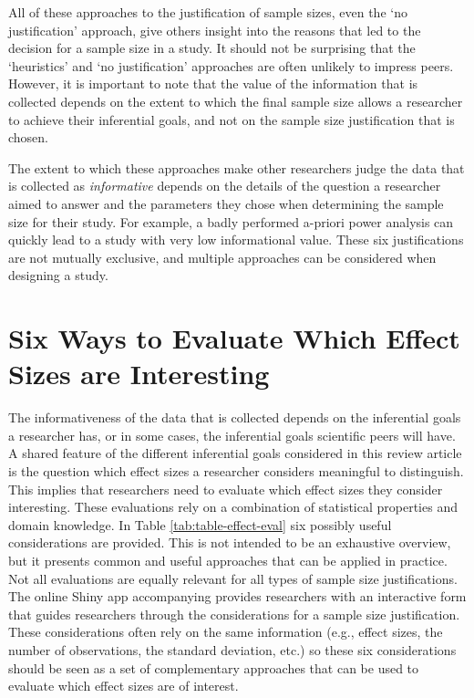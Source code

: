 \documentclass[
  oneside]{krantz}
\begin{document}
All of these approaches to the justification of sample sizes, even the `no justification' approach, give others insight into the reasons that led to the decision for a sample size in a study. It should not be surprising that the `heuristics' and `no justification' approaches are often unlikely to impress peers. However, it is important to note that the value of the information that is collected depends on the extent to which the final sample size allows a researcher to achieve their inferential goals, and not on the sample size justification that is chosen.

The extent to which these approaches make other researchers judge the data that is collected as \emph{informative} depends on the details of the question a researcher aimed to answer and the parameters they chose when determining the sample size for their study. For example, a badly performed a-priori power analysis can quickly lead to a study with very low informational value. These six justifications are not mutually exclusive, and multiple approaches can be considered when designing a study.

\hypertarget{six-ways-to-evaluate-which-effect-sizes-are-interesting}{%
\section{Six Ways to Evaluate Which Effect Sizes are Interesting}\label{six-ways-to-evaluate-which-effect-sizes-are-interesting}}

The informativeness of the data that is collected depends on the inferential goals a researcher has, or in some cases, the inferential goals scientific peers will have. A shared feature of the different inferential goals considered in this review article is the question which effect sizes a researcher considers meaningful to distinguish. This implies that researchers need to evaluate which effect sizes they consider interesting. These evaluations rely on a combination of statistical properties and domain knowledge. In Table \ref{tab:table-effect-eval} six possibly useful considerations are provided. This is not intended to be an exhaustive overview, but it presents common and useful approaches that can be applied in practice. Not all evaluations are equally relevant for all types of sample size justifications. The online Shiny app accompanying \citet{lakens_sample_2022} provides researchers with an interactive form that guides researchers through the considerations for a sample size justification. These considerations often rely on the same information (e.g., effect sizes, the number of observations, the standard deviation, etc.) so these six considerations should be seen as a set of complementary approaches that can be used to evaluate which effect sizes are of interest.
\end{document}
